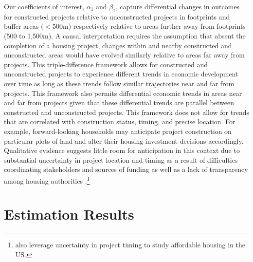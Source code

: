 \documentclass[12pt]{article}
\begin{document}
Our coefficients of interest, $\alpha_1$ and $\beta_1$, capture differential changes in outcomes for constructed projects relative to unconstructed projects in footprints and buffer areas ($<$500m) respectively relative to areas further away from footprints (500 to 1,500m).  A causal interpretation requires the assumption that absent the completion of a housing project, changes within and nearby constructed and unconstructed areas would have evolved similarly relative to areas far away from projects.  This triple-difference framework allows for constructed and unconstructed projects to experience different trends in economic development over time as long as these trends follow similar trajectories near and far from projects.  This framework also permits differential economic trends in areas near and far from projects given that these differential trends are parallel between constructed and unconstructed projects.  This framework does not allow for trends that are correlated with construction status, timing, and precise location.  For example, forward-looking households may anticipate project construction on particular plots of land and alter their housing investment decisions accordingly.  Qualitative evidence suggests little room for anticipation in this context due to substantial uncertainty in project location and timing as a result of difficulties coordinating stakeholders and sources of funding as well as a lack of transparency among housing authorities \citep{serihistory}.\footnote{\cite{diamond2016wants} also leverage uncertainty in project timing to study affordable housing in the US.} 



\section{Estimation Results}\label{section:results}




\end{document}
